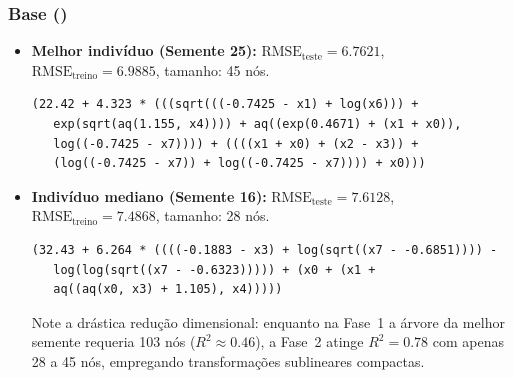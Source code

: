 \subsubsection{Base  ()}
\begin{itemize}
  \item \textbf{Melhor indivíduo (Semente 25):}
        $\text{RMSE}_{\text{teste}} = \mathbf{6.7621}$, $\text{RMSE}_{\text{treino}} = 6.9885$, tamanho: 45 nós.
\begin{lstlisting}
(22.42 + 4.323 * (((sqrt(((-0.7425 - x1) + log(x6))) +
   exp(sqrt(aq(1.155, x4)))) + aq((exp(0.4671) + (x1 + x0)),
   log((-0.7425 - x7)))) + ((((x1 + x0) + (x2 - x3)) +
   (log((-0.7425 - x7)) + log((-0.7425 - x7)))) + x0)))
\end{lstlisting}
  \item \textbf{Indivíduo mediano (Semente 16):}
        $\text{RMSE}_{\text{teste}} = 7.6128$, $\text{RMSE}_{\text{treino}} = 7.4868$, tamanho: 28 nós.
\begin{lstlisting}
(32.43 + 6.264 * ((((-0.1883 - x3) + log(sqrt((x7 - -0.6851)))) -
   log(log(sqrt((x7 - -0.6323))))) + (x0 + (x1 +
   aq((aq(x0, x3) + 1.105), x4)))))
\end{lstlisting}
  Note a drástica redução dimensional: enquanto na Fase~1 a árvore da melhor
  semente requeria 103 nós ($R^2 \approx 0.46$), a Fase~2 atinge $R^2 = 0.78$
  com apenas 28 a 45 nós, empregando transformações sublineares compactas.
\end{itemize}